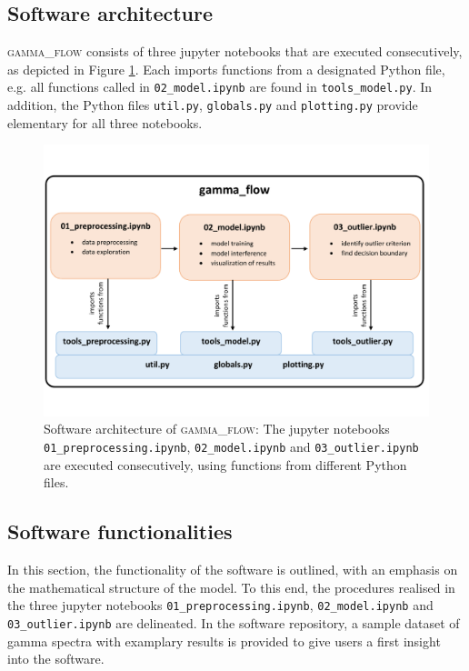 \documentclass[review, 12pt, a4paper]{elsarticle}
\begin{document}
\subsection{Software architecture}
\textsc{gamma\_flow} consists of three jupyter notebooks that are executed consecutively, as depicted in Figure \ref{fig:software_architecture}. Each imports functions from a designated Python file, e.g. all functions called in \texttt{02\_model.ipynb} are found in \texttt{tools\_model.py}. In addition, the Python files \texttt{util.py}, \texttt{globals.py} and \texttt{plotting.py} provide elementary for all three notebooks. 

\begin{figure}[ht]
\includegraphics[width=\textwidth]{software_architecture_gamma_flow.pdf}
\caption{Software architecture of \textsc{gamma\_flow}: The jupyter notebooks \texttt{01\_preprocessing.ipynb}, \texttt{02\_model.ipynb} and \texttt{03\_outlier.ipynb} are executed consecutively, using functions from different Python files. }
\label{fig:software_architecture}
\end{figure}

\subsection{Software functionalities}

In this section, the functionality of the software is outlined, with an emphasis on the mathematical structure of the model. To this end, the procedures realised in the three jupyter notebooks \texttt{01\_preprocessing.ipynb}, \texttt{02\_model.ipynb} and \texttt{03\_outlier.ipynb} are delineated. In the software repository, a sample dataset of gamma spectra with examplary results is provided to give users a first insight into the software. 
\end{document}
